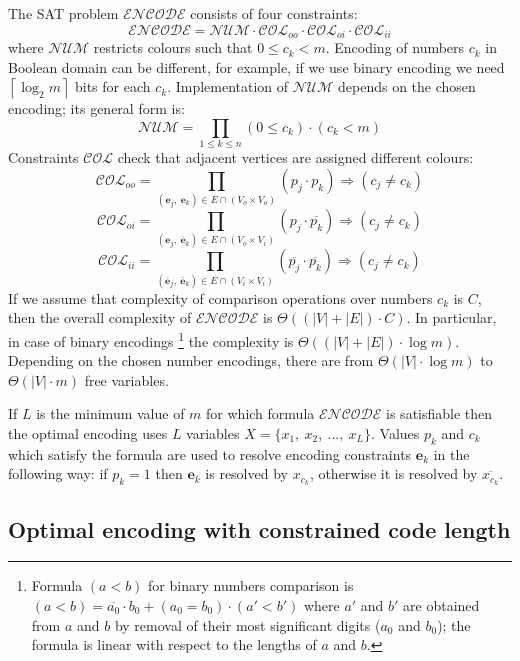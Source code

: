 The SAT problem $\mathcal{ENCODE}$ consists of four constraints:
\[
\mathcal{ENCODE}=\mathcal{NUM}\cdot\mathcal{COL}_{oo}\cdot\mathcal{COL}_{oi}\cdot\mathcal{COL}_{ii}
\]
where $\mathcal{NUM}$ restricts colours such that $0\le c_{k}<m$.
Encoding of numbers $c_{k}$ in Boolean domain can be different, for
example, if we use binary encoding we need $\left\lceil \log_{2}m\right\rceil $
bits for each $c_{k}$. Implementation of $\mathcal{NUM}$ depends
on the chosen encoding; its general form is:
\[
\mathcal{NUM}=\prod_{1\le k\le n}(0\le c_{k})\cdot(c_{k}<m)
\]
Constraints $\mathcal{COL}$ check that adjacent vertices are assigned
different colours:
\[
\mathcal{COL}_{oo}=\prod_{(\mathbf{e}_{j},\ \mathbf{e}_{k})\in E\cap(V_{o}\times V_{o})}(p_{j}\cdot p_{k})\Rightarrow(c_{j}\neq c_{k})
\]
\[
\mathcal{COL}_{oi}=\prod_{(\mathbf{e}_{j},\ \overline{\mathbf{e}}_{k})\in E\cap(V_{o}\times V_{i})}(p_{j}\cdot\overline{p_{k}})\Rightarrow(c_{j}\neq c_{k})
\]
\[
\mathcal{COL}_{ii}=\prod_{(\overline{\mathbf{e}}_{j},\ \overline{\mathbf{e}}_{k})\in E\cap(V_{i}\times V_{i})}(\overline{p_{j}}\cdot\overline{p_{k}})\Rightarrow(c_{j}\neq c_{k})
\]
If we assume that complexity of comparison operations over numbers
$c_{k}$ is $C$, then the overall complexity of $\mathcal{ENCODE}$
is $\Theta((|V|+|E|)\cdot C)$. In particular, in case of binary encodings%
\footnote{Formula $(a<b)$ for binary numbers comparison is $(a<b)=\overline{a_{0}}\cdot b_{0}+(a_{0}=b_{0})\cdot(a'<b')$
where $a'$ and $b'$ are obtained from $a$ and $b$ by removal of
their most significant digits ($a_{0}$ and $b_{0}$); the formula
is linear with respect to the lengths of $a$ and $b$.%
} the complexity is $\Theta((|V|+|E|)\cdot\log m)$. Depending on the
chosen number encodings, there are from $\Theta(|V|\cdot\log m)$
to $\Theta(|V|\cdot m)$ free variables.

If $L$ is the minimum value of $m$ for which formula $\mathcal{ENCODE}$
is satisfiable then the optimal encoding uses $L$ variables $X=\{x_{1},\ x_{2},\ ...,\ x_{L}\}$.
Values $p_{k}$ and $c_{k}$ which satisfy the formula are used to
resolve encoding constraints $\mathbf{e}_{k}$ in the following way:
if $p_{k}=1$ then $\mathbf{e}_{k}$ is resolved by $x_{c_{k}}$,
otherwise it is resolved by $\overline{x_{c_{k}}}$.


\subsection{Optimal encoding with constrained code length}

